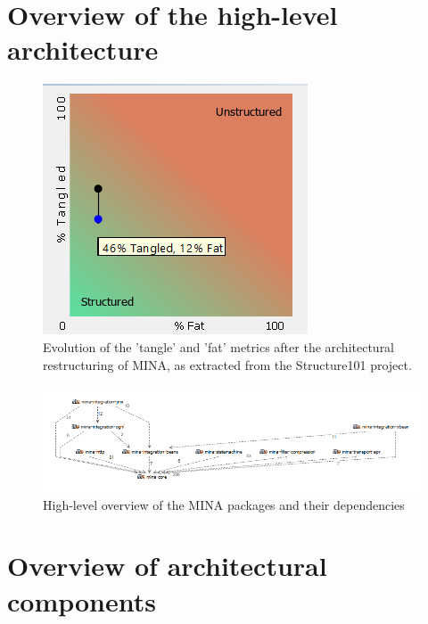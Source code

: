 \section{Overview of the high-level architecture}

\begin{figure}[H]
    \centering
    \includegraphics{images/tangles.png}
    \caption{Evolution of the 'tangle' and 'fat' metrics after the architectural restructuring of MINA, as extracted from the Structure101 project.}
    \label{fig:tangles}
\end{figure}

\begin{landscape}
\begin{figure}
    \centering
    \includegraphics[scale=0.9]{images/MINA_package_dependencies.png}
    \caption{High-level overview of the MINA packages and their dependencies}
    \label{fig:overview_package_dependencies}
\end{figure}
\end{landscape}

\section{Overview of architectural components}
